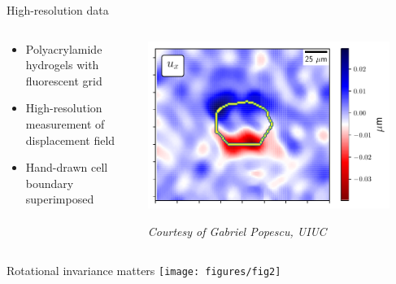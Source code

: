 \documentclass[presentation,aspectratio=169]{beamer}
\begin{document}
 \begin{frame}{High-resolution data}
 \begin{columns}
 \begin{column}{0.35\textwidth}
 \begin{itemize}
 \item Polyacrylamide hydrogels with fluorescent grid 
 \item High-resolution measurement of displacement field
 \item Hand-drawn cell boundary superimposed
 \end{itemize}
 \end{column}
 \begin{column}{0.7\textwidth}
 \centering
 \includegraphics[width=0.9\textwidth]{figures/fig0a}
  
 \emph{Courtesy of Gabriel Popescu, UIUC}
  \end{column}
  \end{columns}
 \end{frame}
 
\begin{frame}{Rotational invariance matters}
\centering
\texttt{[image: figures/fig2]}\ 
\end{frame}
\end{document}

